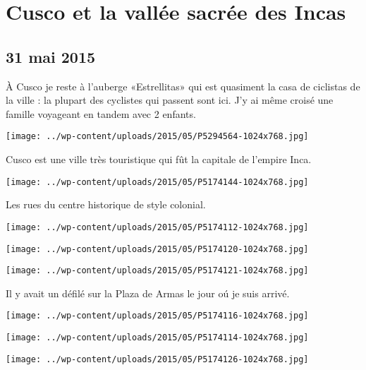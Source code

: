 \chapter{Cusco et la vallée sacrée des Incas}
\section*{31 mai 2015}
À Cusco je reste à l'auberge «Estrellitas» qui est quasiment la casa de ciclistas de la ville : la plupart des cyclistes qui passent sont ici. J'y ai même croisé une famille voyageant en tandem avec 2 enfants. \newline
 \newline
\centerline{\texttt{[image: ../wp-content/uploads/2015/05/P5294564-1024x768.jpg]} } 
 \newline
 Cusco est une ville très touristique qui fût la capitale de l'empire Inca. \newline
 \newline
\centerline{\texttt{[image: ../wp-content/uploads/2015/05/P5174144-1024x768.jpg]} } 
 \newline
 Les rues du centre historique de style colonial. \newline
 \newline
\centerline{\texttt{[image: ../wp-content/uploads/2015/05/P5174112-1024x768.jpg]} } 
 \newline
 \newline
\centerline{\texttt{[image: ../wp-content/uploads/2015/05/P5174120-1024x768.jpg]} } 
 \newline
 \newline
\centerline{\texttt{[image: ../wp-content/uploads/2015/05/P5174121-1024x768.jpg]} } 
 \newline
 Il y avait un défilé sur la Plaza de Armas le jour oú je suis arrivé. \newline
 \newline
\centerline{\texttt{[image: ../wp-content/uploads/2015/05/P5174116-1024x768.jpg]} } 
 \newline
 \newline
\centerline{\texttt{[image: ../wp-content/uploads/2015/05/P5174114-1024x768.jpg]} } 
 \newline
 \newline
\centerline{\texttt{[image: ../wp-content/uploads/2015/05/P5174126-1024x768.jpg]} } 
 \newline
